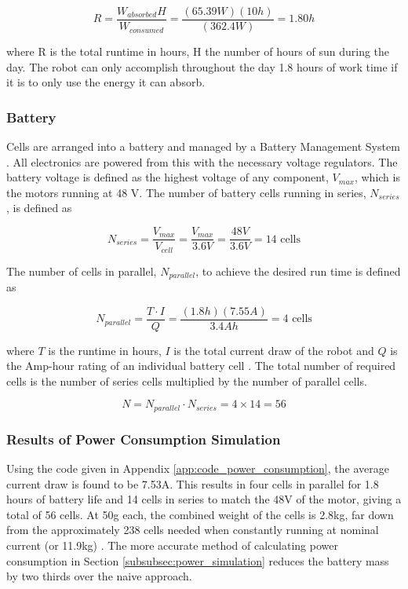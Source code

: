 \begin{equation}
    R = \frac{W_{absorbed} H}{W_{consumed}} = \frac{(65.39W)(10h)}{(362.4W)} = 1.80 h
\end{equation}

where R is the total runtime in hours, H the number of hours of sun during the day. The robot can only accomplish throughout the day 1.8 hours of work time if it is to only use the energy it can absorb.

\subsubsection{Battery} \label{subsub:battery}

Cells are arranged into a battery and managed by a Battery Management System \cite{voltaplex_6s16s_nodate}. All electronics are powered from this with the necessary voltage regulators.
The battery voltage is defined as the highest voltage of any component, $V_{max}$, which is the motors running at 48 V.
The number of battery cells running in series, $N_{series}$, is defined as

\begin{equation}
    N_{series} = \frac{V_{max}}{V_{cell}} = \frac{V_{max}}{3.6 V} = \frac{48V}{3.6V} = 14 \text{ cells}
\end{equation}

The number of cells in parallel, $N_{parallel}$, to achieve the desired run time is defined as

\begin{equation}
    N_{parallel} = \frac{T \cdot I}{Q} = \frac{(1.8h)(7.55A)}{3.4Ah} = 4 \text{ cells}
\end{equation}

where $T$ is the runtime in hours, $I$ is the total current draw of the robot and $Q$ is the Amp-hour rating of an individual battery cell \cite{digikey_electronics_battery_nodate}.
The total number of required cells is the number of series cells multiplied by the number of parallel cells.

\begin{equation}
    N = N_{parallel} \cdot N_{series} = 4\times 14 = 56
\end{equation}

\subsubsection{Results of Power Consumption Simulation}

Using the code given in Appendix \ref{app:code_power_consumption}, the average current draw is found to be 7.53A.
This results in four cells in parallel for 1.8 hours of battery life and 14 cells in series to match the 48V of the motor, giving a total of 56 cells.
At 50g each, the combined weight of the cells is 2.8kg, far down from the approximately 238 cells needed when constantly running at nominal current (or 11.9kg) \cite{18650batterystore_18650_nodate}.
The more accurate method of calculating power consumption in Section \ref{subsubsec:power_simulation} reduces the battery mass by two thirds over the naive approach.